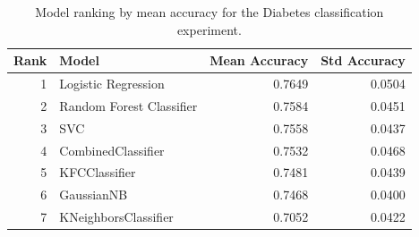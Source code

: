 \begin{table}
\caption{Model ranking by mean accuracy for the Diabetes classification experiment.}
\label{tab:diabetes_model_ranking}
\begin{tabular}{rlrr}
\toprule
Rank & Model & Mean Accuracy & Std Accuracy \\
\midrule
1 & Logistic Regression & 0.7649 & 0.0504 \\
2 & Random Forest Classifier & 0.7584 & 0.0451 \\
3 & SVC & 0.7558 & 0.0437 \\
4 & CombinedClassifier & 0.7532 & 0.0468 \\
5 & KFCClassifier & 0.7481 & 0.0439 \\
6 & GaussianNB & 0.7468 & 0.0400 \\
7 & KNeighborsClassifier & 0.7052 & 0.0422 \\
\bottomrule
\end{tabular}
\end{table}
